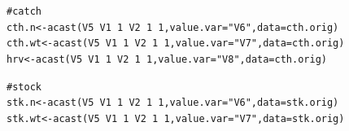 \documentclass[a4paper,english,10pt]{article}\usepackage[]{graphicx}\usepackage[]{color}
\makeatletter
\newcommand{\hlnum}[1]{\textcolor[rgb]{0.2,0.2,0.2}{#1}}%
\newcommand{\hlstr}[1]{\textcolor[rgb]{0.2,0.2,0.2}{#1}}%
\newcommand{\hlcom}[1]{\textcolor[rgb]{0.2,0.267,0.4}{#1}}%
\newcommand{\hlopt}[1]{\textcolor[rgb]{0.2,0.2,0.2}{#1}}%
\newcommand{\hlstd}[1]{\textcolor[rgb]{0,0,0}{#1}}%
\newcommand{\hlkwb}[1]{\textcolor[rgb]{0.361,0.506,0.596}{#1}}%
\newcommand{\hlkwc}[1]{\textcolor[rgb]{0.361,0.506,0.596}{#1}}%
\newcommand{\hlkwd}[1]{\textcolor[rgb]{0.361,0.506,0.596}{#1}}%
\newenvironment{kframe}{%
 \def\at@end@of@kframe{}%
 \ifinner\ifhmode%
  \def\at@end@of@kframe{\end{minipage}}%
  \begin{minipage}{\columnwidth}%
 \fi\fi%
 \def\FrameCommand##1{\hskip\@totalleftmargin \hskip-\fboxsep
 \colorbox{shadecolor}{##1}\hskip-\fboxsep
     \hskip-\linewidth \hskip-\@totalleftmargin \hskip\columnwidth}%
 \MakeFramed {\advance\hsize-\width
   \@totalleftmargin\z@ \linewidth\hsize
   \@setminipage}}%
 {\par\unskip\endMakeFramed%
 \at@end@of@kframe}
\newenvironment{knitrout}{}{} %
\makeatother
\begin{document}
\begin{knitrout}
\color{fgcolor}\begin{kframe}
\begin{alltt}
\hlcom{# catch}
\hlstd{cth.n} \hlkwb{<-} \hlkwd{acast}\hlstd{(V5} \hlopt{~} \hlstd{V1} \hlopt{~} \hlnum{1} \hlopt{~} \hlstd{V2} \hlopt{~} \hlnum{1} \hlopt{~} \hlnum{1}\hlstd{,} \hlkwc{value.var} \hlstd{=} \hlstr{"V6"}\hlstd{,} \hlkwc{data} \hlstd{= cth.orig)}
\hlstd{cth.wt} \hlkwb{<-} \hlkwd{acast}\hlstd{(V5} \hlopt{~} \hlstd{V1} \hlopt{~} \hlnum{1} \hlopt{~} \hlstd{V2} \hlopt{~} \hlnum{1} \hlopt{~} \hlnum{1}\hlstd{,} \hlkwc{value.var} \hlstd{=} \hlstr{"V7"}\hlstd{,} \hlkwc{data} \hlstd{= cth.orig)}
\hlstd{hrv} \hlkwb{<-} \hlkwd{acast}\hlstd{(V5} \hlopt{~} \hlstd{V1} \hlopt{~} \hlnum{1} \hlopt{~} \hlstd{V2} \hlopt{~} \hlnum{1} \hlopt{~} \hlnum{1}\hlstd{,} \hlkwc{value.var} \hlstd{=} \hlstr{"V8"}\hlstd{,} \hlkwc{data} \hlstd{= cth.orig)}

\hlcom{# stock}
\hlstd{stk.n} \hlkwb{<-} \hlkwd{acast}\hlstd{(V5} \hlopt{~} \hlstd{V1} \hlopt{~} \hlnum{1} \hlopt{~} \hlstd{V2} \hlopt{~} \hlnum{1} \hlopt{~} \hlnum{1}\hlstd{,} \hlkwc{value.var} \hlstd{=} \hlstr{"V6"}\hlstd{,} \hlkwc{data} \hlstd{= stk.orig)}
\hlstd{stk.wt} \hlkwb{<-} \hlkwd{acast}\hlstd{(V5} \hlopt{~} \hlstd{V1} \hlopt{~} \hlnum{1} \hlopt{~} \hlstd{V2} \hlopt{~} \hlnum{1} \hlopt{~} \hlnum{1}\hlstd{,} \hlkwc{value.var} \hlstd{=} \hlstr{"V7"}\hlstd{,} \hlkwc{data} \hlstd{= stk.orig)}


\end{alltt}
\end{kframe}
\end{knitrout}
\end{document}
